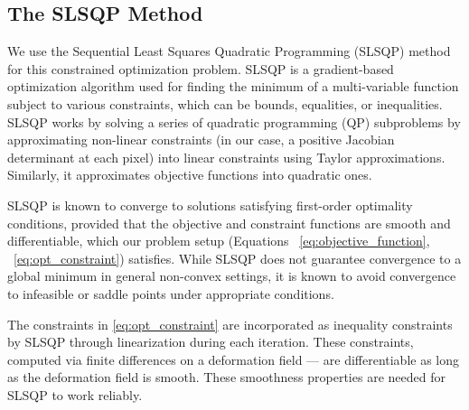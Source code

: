 \documentclass[lettersize,journal]{IEEEtran}
\begin{document}
\subsection{The SLSQP Method}
\label{sec:slsqp_method}

We use the Sequential Least Squares Quadratic Programming (SLSQP) method \cite{Kraft_1988, SciPySLSQPDoc} for this constrained optimization problem. SLSQP is a gradient-based optimization algorithm used for finding the minimum of a multi-variable function subject to various constraints, which can be bounds, equalities, or inequalities. SLSQP works by solving a series of quadratic programming (QP) subproblems by approximating non-linear constraints (in our case, a positive Jacobian determinant at each pixel) into linear constraints using Taylor approximations. Similarly, it approximates objective functions into quadratic ones.

SLSQP is known to converge to solutions satisfying first-order optimality conditions, provided that the objective and constraint functions are smooth and differentiable, which our problem setup (Equations ~\ref{eq:objective_function},  ~\ref{eq:opt_constraint}) satisfies. While SLSQP does not guarantee convergence to a global minimum in general non-convex settings, it is known to avoid convergence to infeasible or saddle points under appropriate conditions.

The constraints in \autoref{eq:opt_constraint} are incorporated as inequality constraints by SLSQP through linearization during each iteration. These constraints, computed via finite differences on a deformation field — are differentiable as long as the deformation field is smooth. These smoothness properties are needed for SLSQP to work reliably.


\end{document}
